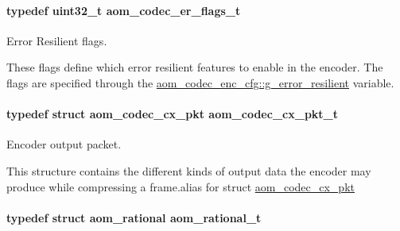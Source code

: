 \paragraph[{\texorpdfstring{aom\+\_\+codec\+\_\+er\+\_\+flags\+\_\+t}{aom_codec_er_flags_t}}]{\setlength{\rightskip}{0pt plus 5cm}typedef uint32\+\_\+t {\bf aom\+\_\+codec\+\_\+er\+\_\+flags\+\_\+t}}\hypertarget{group__encoder_ga5f326af84993f371bb165883bb5a5a59}{}\label{group__encoder_ga5f326af84993f371bb165883bb5a5a59}


Error Resilient flags. 

These flags define which error resilient features to enable in the encoder. The flags are specified through the \hyperlink{structaom__codec__enc__cfg_a8f3763485bb1f6eea6466b2fe0da2304}{aom\+\_\+codec\+\_\+enc\+\_\+cfg\+::g\+\_\+error\+\_\+resilient} variable. 
\paragraph[{\texorpdfstring{aom\+\_\+codec\+\_\+cx\+\_\+pkt\+\_\+t}{aom_codec_cx_pkt_t}}]{\setlength{\rightskip}{0pt plus 5cm}typedef struct {\bf aom\+\_\+codec\+\_\+cx\+\_\+pkt}  {\bf aom\+\_\+codec\+\_\+cx\+\_\+pkt\+\_\+t}}\hypertarget{group__encoder_ga2373bdec1f53ddb0736c53a5ebce7b7b}{}\label{group__encoder_ga2373bdec1f53ddb0736c53a5ebce7b7b}


Encoder output packet. 

This structure contains the different kinds of output data the encoder may produce while compressing a frame.\+alias for struct \hyperlink{structaom__codec__cx__pkt}{aom\+\_\+codec\+\_\+cx\+\_\+pkt} 
\paragraph[{\texorpdfstring{aom\+\_\+rational\+\_\+t}{aom_rational_t}}]{\setlength{\rightskip}{0pt plus 5cm}typedef struct {\bf aom\+\_\+rational}  {\bf aom\+\_\+rational\+\_\+t}}\hypertarget{group__encoder_ga89310b75f722a6f3ee5e88d9b0f5853f}{}\label{group__encoder_ga89310b75f722a6f3ee5e88d9b0f5853f}


